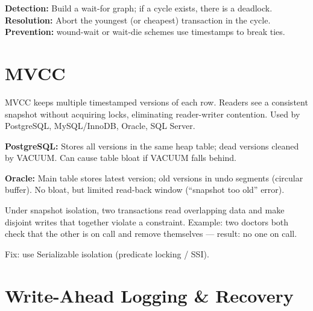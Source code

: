 \begin{interviewbox}
\textbf{Detection:} Build a wait-for graph; if a cycle exists, there is a deadlock.  \textbf{Resolution:} Abort the youngest (or cheapest) transaction in the cycle.  \textbf{Prevention:} wound-wait or wait-die schemes use timestamps to break ties.
\end{interviewbox}

\section{MVCC}

\begin{interviewbox}
MVCC keeps multiple timestamped versions of each row.  Readers see a consistent snapshot without acquiring locks, eliminating reader-writer contention.  Used by PostgreSQL, MySQL/InnoDB, Oracle, SQL Server.
\end{interviewbox}

\begin{interviewbox}
\textbf{PostgreSQL:} Stores all versions in the same heap table; dead versions cleaned by VACUUM.  Can cause table bloat if VACUUM falls behind.

\textbf{Oracle:} Main table stores latest version; old versions in undo segments (circular buffer).  No bloat, but limited read-back window (``snapshot too old'' error).
\end{interviewbox}

\begin{interviewbox}
Under snapshot isolation, two transactions read overlapping data and make disjoint writes that together violate a constraint.  Example: two doctors both check that the other is on call and remove themselves --- result: no one on call.

Fix: use Serializable isolation (predicate locking / SSI).
\end{interviewbox}

\section{Write-Ahead Logging \& Recovery}

